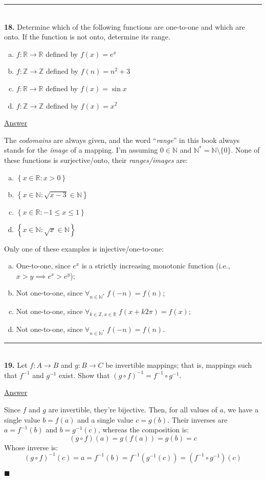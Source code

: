 \documentclass{article}[10pt]
\newenvironment{exercise}[1]
    {\noindent\rule{2cm}{0.4pt} \\
     \textbf{#1.}}
    {}
\newcommand{\answer}{

  \underline{Answer}

}
\newcommand{\qed}{

\hfill\ensuremath{\blacksquare}

}
\begin{document}
\begin{exercise}{18}
  Determine which of the following functions are one-to-one
  and which are onto.
  If the function is not onto, determine its range.
  \begin{enumerate}[(a)]
    \item $f : \mathds{R} \to \mathds{R}$ defined by $f(x) = e^x$
    \item $f : \mathds{Z} \to \mathds{Z}$ defined by $f(n) = n^2 + 3$
    \item $f : \mathds{R} \to \mathds{R}$ defined by $f(x) = \sin x$
    \item $f : \mathds{Z} \to \mathds{Z}$ defined by $f(x) = x^2$
  \end{enumerate}
  \answer
  The \emph{codomains} are always given,
  and the word ``\emph{range}'' in this book
  always stands for the \emph{image} of a mapping.
  I'm assuming $0 \in \mathds{N}$
  and $\mathds{N}^* = \mathds{N} \setminus \{0\}$.
  None of these functions is surjective/onto,
  their \emph{ranges/images} are:
  \begin{enumerate}[(a)]
    \item $\left\{ x \in \mathds{R} : x > 0 \right\}$
    \item $\left\{ x \in \mathds{N} :
                     \sqrt{x - 3} \in \mathds{N} \right\}$
    \item $\left\{ x \in \mathds{R} : -1 \le x \le 1 \right\}$
    \item $\left\{ x \in \mathds{N} :
                     \sqrt{x} \in \mathds{N} \right\}$
  \end{enumerate}
  Only one of these examples is injective/one-to-one:
  \begin{enumerate}[(a)]
    \item One-to-one,
          since $e^x$ is a strictly increasing monotonic function
          (i.e., $x > y \implies e^x > e^y$);
    \item Not one-to-one,
          since $\forall_{n \in \mathds{N}^*} \; f(-n) = f(n)$;
    \item Not one-to-one,
          since $\forall_{k \in \mathds{Z}, x \in \mathds{R}} \;
                 f(x + k 2 \pi) = f(x)$;
    \item Not one-to-one,
          since $\forall_{n \in \mathds{N}^*} \; f(-n) = f(n)$.
  \end{enumerate}
\end{exercise}


\begin{exercise}{19}
  Let $f : A \to B$ and $g : B \to C$ be invertible mappings;
  that is, mappings such that $f^{-1}$ and $g^{-1}$ exist.
  Show that $(g \circ f)^{-1} = f^{-1} \circ g^{-1}$.
  \answer
  Since $f$ and $g$ are invertible,
  they're bijective.
  Then, for all values of $a$,
  we have a single value $b = f(a)$
  and a single value $c = g(b)$.
  Their inverses are $a = f^{-1}(b)$ and $b = g^{-1}(c)$,
  whereas the composition is:
  \[(g \circ f)(a) = g(f(a)) = g(b) = c\]
  Whose inverse is:
  \[
    (g \circ f)^{-1}(c)
    = a
    = f^{-1}(b)
    = f^{-1}(g^{-1}(c))
    = (f^{-1} \circ g^{-1})(c)
  \]
  \qed
\end{exercise}
\end{document}

